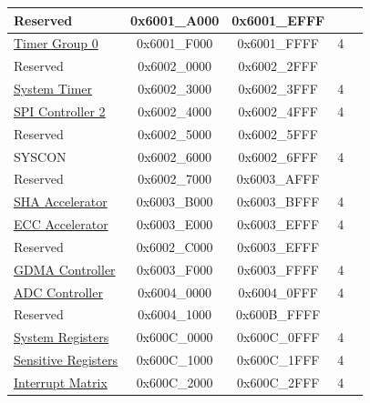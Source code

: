 \begin{longtable}[c]{ |p{5cm}|c|c|r|p{1.0cm}| }
    \rowcolor{gray!25}  Reserved                    & 0x6001\_A000 & 0x6001\_EFFF &        &   \\\hline
                        \hyperref[mod:timg]{Timer Group 0}              & 0x6001\_F000 & 0x6001\_FFFF &   4    &   \\\hline
    \rowcolor{gray!25}  Reserved                    & 0x6002\_0000 & 0x6002\_2FFF &        &   \\\hline
                        \hyperref[mod:systimer]{System Timer}              & 0x6002\_3000 & 0x6002\_3FFF &   4    &   \\\hline
                        \hyperref[mod:spi]{SPI Controller 2}            & 0x6002\_4000 & 0x6002\_4FFF &   4    &   \\\hline
    \rowcolor{gray!25}  Reserved                    & 0x6002\_5000 & 0x6002\_5FFF &        &   \\\hline
                        SYSCON              & 0x6002\_6000 & 0x6002\_6FFF &   4    &   \\\hline
    \rowcolor{gray!25}  Reserved                    & 0x6002\_7000 & 0x6003\_AFFF &        &   \\\hline
                        \hyperref[mod:sha]{SHA Accelerator}              & 0x6003\_B000 & 0x6003\_BFFF &   4    &   \\\hline
                        \hyperref[mod:ecc]{ECC Accelerator}              & 0x6003\_E000 & 0x6003\_EFFF &   4    &   \\\hline
    \rowcolor{gray!25}  Reserved                    & 0x6002\_C000 & 0x6003\_EFFF &        &   \\\hline
                        \hyperref[mod:dma]{GDMA Controller}         & 0x6003\_F000 & 0x6003\_FFFF &   4    &   \\\hline
                        \hyperref[mod:sensor]{ADC Controller}              & 0x6004\_0000 & 0x6004\_0FFF &   4    &   \\\hline
    \rowcolor{gray!25}  Reserved                    & 0x6004\_1000 & 0x600B\_FFFF &        &   \\\hline
                        \hyperref[mod:sysreg]{System Registers}              & 0x600C\_0000 & 0x600C\_0FFF &   4    &   \\\hline
                        \href{https://github.com/espressif/esp-idf/blob/master/components/soc/esp32c2/register/soc/sensitive_reg.h}{Sensitive Registers}      & 0x600C\_1000 & 0x600C\_1FFF &   4    &   \\\hline
                        \hyperref[mod:intmtrx]{Interrupt Matrix}                & 0x600C\_2000 & 0x600C\_2FFF &   4    &   \\\hline

\end{longtable}
